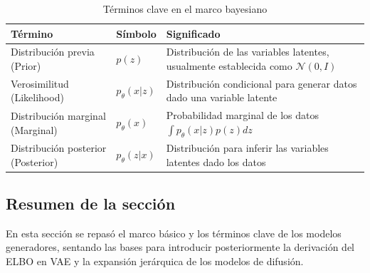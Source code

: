 \begin{table}[H]
\centering
\begin{tabular}{lll}
\toprule
\textbf{Término} & \textbf{Símbolo} & \textbf{Significado} \\
\midrule
Distribución previa (Prior) & $p(z)$ & Distribución de las variables latentes, usualmente establecida como $\mathcal{N}(0, I)$ \\
Verosimilitud (Likelihood) & $p_\theta(x|z)$ & Distribución condicional para generar datos dado una variable latente \\
Distribución marginal (Marginal) & $p_\theta(x)$ & Probabilidad marginal de los datos $\int p_\theta(x|z)p(z)dz$ \\
Distribución posterior (Posterior) & $p_\theta(z|x)$ & Distribución para inferir las variables latentes dado los datos \\
\bottomrule
\end{tabular}
\caption{Términos clave en el marco bayesiano}
\end{table}

\subsection{Resumen de la sección}

En esta sección se repasó el marco básico y los términos clave de los modelos generadores, sentando las bases para introducir posteriormente la derivación del ELBO en VAE y la expansión jerárquica de los modelos de difusión.
